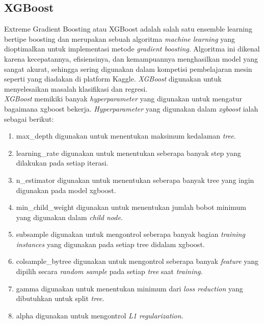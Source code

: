 \subsection{XGBoost} \label{II.xgboost}
Extreme Gradient Boosting atau XGBoost adalah salah satu ensemble learning bertipe boosting dan merupakan sebuah algoritma \textit{machine learning} yang dioptimalkan untuk implementasi metode \textit{gradient boosting}\cite{chen2015xgboost}. Algoritma ini dikenal karena kecepatannya, efisiensinya, dan kemampuannya menghasilkan model yang sangat akurat, sehingga sering digunakan dalam kompetisi pembelajaran mesin seperti yang diadakan di platform Kaggle.
\textit{XGBoost} digunakan untuk menyelesaikan masalah klasifikasi dan regresi\cite{chen2016xgboost}.\\
\textit{XGBoost} memikiki banyak \textit{hyperparameter} yang digunakan untuk mengatur bagaimana xgboost bekerja. \textit{Hyperparameter} yang digunakan dalam \textit{xgboost} ialah sebagai berikut\cite{xgboost_parameter_documentation}:
\begin{enumerate}[noitemsep]
    \item max\_depth digunakan untuk menentukan maksimum kedalaman \textit{tree}.
    \item learning\_rate digunakan untuk menentukan seberapa banyak step yang dilakukan pada setiap iterasi.
    \item n\_estimator digunakan untuk menentukan seberapa banyak tree yang ingin digunakan pada model xgboost.
    \item min\_child\_weight digunakan untuk menentukan jumlah bobot minimum yang digunakan dalam \textit{child node}.
    \item subsample digunakan untuk mengontrol seberapa banyak bagian \textit{training instances} yang digunakan pada setiap tree didalam xgboost.
    \item colsample\_bytree digunakan untuk mengontrol seberapa banyak \textit{feature} yang dipilih secara \textit{random sample} pada setiap \textit{tree} saat \textit{training}.
    \item gamma digunakan untuk menentukan minimum dari \textit{loss reduction} yang dibutuhkan untuk split \textit{tree}.
    \item alpha digunakan untuk mengontrol \textit{L1 regularization}.
\end{enumerate}

